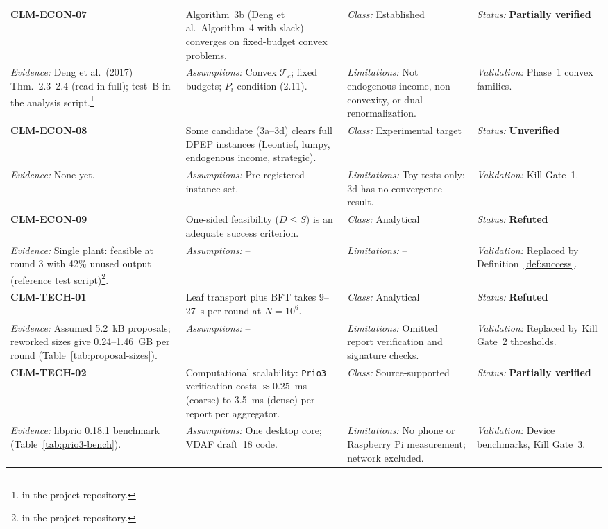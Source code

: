 \documentclass[10pt,twoside,openany]{book}
\theoremstyle{dpepstyle}
\begin{document}
{\begin{longtable}{L{0.92in} L{1.42in} L{1.07in} L{1.12in}}
\addlinespace[1pt]\midrule
\textbf{CLM-ECON-07} & Algorithm~3b (Deng et al.\ Algorithm~4 with slack) converges on fixed-budget convex problems. & \emph{Class:} Established & \emph{Status:} \textbf{Partially verified} \\*
\emph{Evidence:} Deng et al.\ (2017) Thm.~2.3--2.4 (read in full); test~B in the analysis script.\footnote{ in the project repository.} & \emph{Assumptions:} Convex $\mathcal{T}_c$; fixed budgets; $P_i$ condition (2.11). & \emph{Limitations:} Not endogenous income, non-convexity, or dual renormalization. & \emph{Validation:} Phase~1 convex families. \\
\addlinespace[1pt]\midrule
\textbf{CLM-ECON-08} & Some candidate (3a--3d) clears full DPEP instances (Leontief, lumpy, endogenous income, strategic). & \emph{Class:} Experimental target & \emph{Status:} \textbf{Unverified} \\*
\emph{Evidence:} None yet. & \emph{Assumptions:} Pre-registered instance set. & \emph{Limitations:} Toy tests only; 3d has no convergence result. & \emph{Validation:} Kill Gate~1. \\
\addlinespace[1pt]\midrule
\textbf{CLM-ECON-09} & One-sided feasibility ($D\le S$) is an adequate success criterion. & \emph{Class:} Analytical & \emph{Status:} \textbf{Refuted} \\*
\emph{Evidence:} Single plant: feasible at round 3 with 42\% unused output (reference test script)\footnote{ in the project repository.}. & \emph{Assumptions:} -- & \emph{Limitations:} -- & \emph{Validation:} Replaced by Definition~\ref{def:success}. \\
\addlinespace[1pt]\midrule
\textbf{CLM-TECH-01} & Leaf transport plus BFT takes 9--27~s per round at $N=10^6$. & \emph{Class:} Analytical & \emph{Status:} \textbf{Refuted} \\*
\emph{Evidence:} Assumed 5.2~kB proposals; reworked sizes give 0.24--1.46~GB per round (Table~\ref{tab:proposal-sizes}). & \emph{Assumptions:} -- & \emph{Limitations:} Omitted report verification and signature checks. & \emph{Validation:} Replaced by Kill Gate~2 thresholds. \\
\addlinespace[1pt]\midrule
\textbf{CLM-TECH-02} & Computational scalability: \texttt{Prio3} verification costs $\approx 0.25$~ms (coarse) to 3.5~ms (dense) per report per aggregator. & \emph{Class:} Source-supported & \emph{Status:} \textbf{Partially verified} \\*
\emph{Evidence:} libprio 0.18.1 benchmark (Table~\ref{tab:prio3-bench}). & \emph{Assumptions:} One desktop core; VDAF draft~18 code. & \emph{Limitations:} No phone or Raspberry Pi measurement; network excluded. & \emph{Validation:} Device benchmarks, Kill Gate~3. \\

\end{longtable}}
\end{document}
